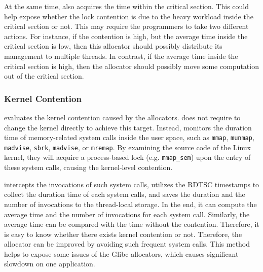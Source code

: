At the same time, \MP{} also acquires the time within the critical section. This could help expose whether the lock contention is due to the heavy workload inside the critical section or not. This may require the programmers to take two different actions. For instance, if the contention is high, but the average time inside the critical section is low, then this allocator should possibly distribute its management to multiple threads. In contrast, if the average time inside the critical section is high, then the allocator should possibly move some computation out of the critical section. 


\subsubsection{Kernel Contention}
\MP{} evaluates the kernel contention caused by the allocators. \MP{} does not require to change the kernel directly to achieve this target. Instead, \MP{} monitors the duration time of memory-related system calls inside the user space, such as \texttt{mmap}, \texttt{munmap}, \texttt{madvise}, \texttt{sbrk}, \texttt{madvise}, or \texttt{mremap}. By examining the source code of the Linux kernel, they will acquire a process-based lock (e.g. \texttt{mmap\_sem}) upon the entry of these system calls, causing the kernel-level contention.   

\MP{} intercepts the invocations of such system calls, utilizes the RDTSC timestamps to collect the duration time of each system calls, and saves the duration and the number of invocations to the thread-local storage. In the end, it can compute the average time and the number of invocations for each system call. Similarly, the average time can be compared with the time without the contention. Therefore, it is easy to know whether there exists kernel contention or not. Therefore, the allocator can be improved by avoiding such frequent system calls. This method helps to expose some issues of the Glibc allocators, which causes significant slowdown on one application. 

  

\begin{comment}
   the information can be utilized to tell whether an allocator has significant  
As we all know, memory allocators may invoke multiple system calls inside allocation and deallocation. 
User space contention:
How many separate locks are explicitly utilized? 
How many lock acquisitions? How much time are spending on lock waiting for each thread, and in total?

How much time spending on kernel-space contention? For instance, we could infer from memory-related system calls, such as mmap, munmap, madvise, brk, or something else? 

That is, we may have to integrate with SyncPerf for doing this. We will borrow their implementation in order to do this. 
\end{comment}

